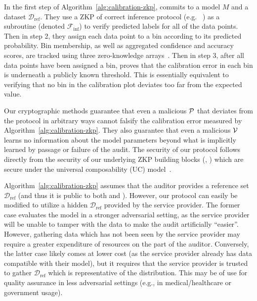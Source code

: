 In the first step of Algorithm~\ref{alg:calibration-zkp}, \prover commits to a model $M$ and a dataset $\mathcal{D}_{\text{ref}}$. They use a ZKP of correct inference protocol (e.g. ~\cite{weng2021mystique,sun2024zkllm}) as a subroutine (denoted $\mathcal{F}_{\text{inf}}$) to verify predicted labels for all of the data points. Then in step 2, they assign each data point to a bin according to its predicted probability. Bin membership, as well as aggregated confidence and accuracy scores, are tracked using three zero-knowledge arrays~\cite{franzese2021zkram}. Then in step 3, after all data points have been assigned a bin, \prover proves that the calibration error in each bin is underneath a publicly known threshold. This is essentially equivalent to verifying that no bin in the calibration plot deviates too far from the expected value.  

Our cryptographic methods guarantee that even a malicious $\mathcal{P}$ that deviates from the protocol in arbitrary ways cannot falsify the calibration error measured by Algorithm~\ref{alg:calibration-zkp}. They also guarantee that even a malicious $\mathcal{V}$ learns no information about the model parameters beyond what is implicitly learned by passage or failure of the audit. The security of our protocol follows directly from the security of our underlying ZKP building blocks (\cite{weng2021wolverine}, \cite{franzese2021zkram}) which are secure under the universal composability (UC) model~\cite{canetti2001UC}.

 Algorithm~\ref{alg:calibration-zkp} assumes that the auditor provides a reference set $\mathcal{D}_{\text{ref}}$ (and thus it is public to both \prover and \verifier). However, our protocol can easily be modified to utilize a hidden $\mathcal{D}_{\text{ref}}$ provided by the service provider. The former case evaluates the model in a stronger adversarial setting, as the service provider will be unable to tamper with the data to make the audit artificially ``easier''. However, gathering data which has not been seen by the service provider may require a greater expenditure of resources on the part of the auditor. Conversely, the latter case likely comes at lower cost (as the service provider already has data compatible with their model), but it requires that the service provider is trusted to gather $\mathcal{D}_{\text{ref}}$ which is representative of the distribution. This may be of use for quality assurance in less adversarial settings (e.g., in medical/healthcare or government usage).

